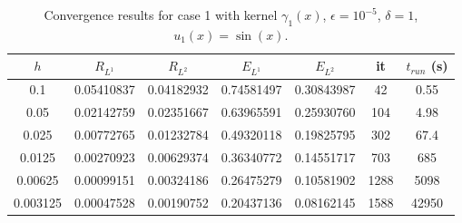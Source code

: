 \documentclass[11pt]{amsart}   	%
\theoremstyle{plain}
\numberwithin{equation}{section}
\begin{document}

\begin{table}[H]
    \centering
    \caption{Convergence results for case 1 with kernel $\gamma_1(x)$, $\epsilon=10^{-5}$, $\delta=1$, $u_1(x)=\sin(x)$.}%
    \begin{tabular}{|c||c|c||c|c||c|c|}
    \hline 
    $h$ & $R_{L^1}$ & $R_{L^2} $& $E_{L^1}$  & $E_{L^2}$ & it & $t_{run}$ (s)
    \\ \hline
    0.1 &  0.05410837 &  0.04182932 & 0.74581497  & 0.30843987 & 42 & 0.55 
    \\ \hline
    0.05 & 0.02142759 & 0.02351667 & 0.63965591 & 0.25930760 & 104 & 4.98 
    \\ \hline
    0.025 & 0.00772765 & 0.01232784 & 0.49320118 & 0.19825795 & 302 & 67.4     
    \\ \hline
    0.0125 & 0.00270923 & 0.00629374 & 0.36340772 & 0.14551717 & 703 & 685 
    \\ \hline
    0.00625 & 0.00099151 & 0.00324186 & 0.26475279 & 0.10581902 & 1288 & 5098  
    \\ \hline
    0.003125 & 0.00047528 & 0.00190752 & 0.20437136 & 0.08162145 & 1588 & 42950
    \\ \hline  
    \end{tabular}
    \label{tab:num_case_1abis}
\end{table}
\end{document}
